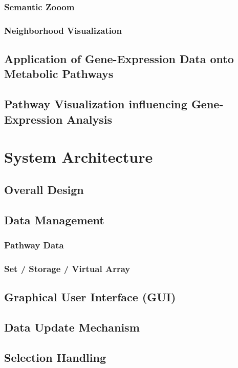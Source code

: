 \subsection{Semantic Zooom}
\subsection{Neighborhood Visualization}

\section{Application of Gene-Expression Data onto Metabolic Pathways}

\section{Pathway Visualization influencing Gene-Expression Analysis}

\chapter{System Architecture}

\section{Overall Design}
\section{Data Management}
\subsection{Pathway Data}
\subsection{Set / Storage / Virtual Array}


\section{Graphical User Interface (GUI)}

\section{Data Update Mechanism}

\section{Selection Handling}

